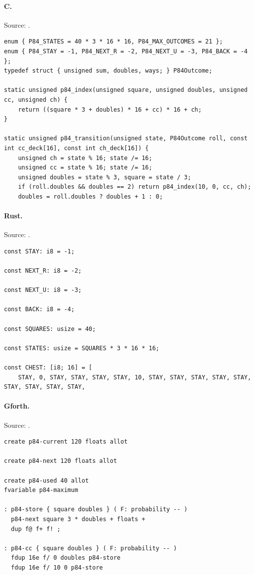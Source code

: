 \paragraph{C.} Source: .
\begin{lstlisting}
enum { P84_STATES = 40 * 3 * 16 * 16, P84_MAX_OUTCOMES = 21 };
enum { P84_STAY = -1, P84_NEXT_R = -2, P84_NEXT_U = -3, P84_BACK = -4 };
typedef struct { unsigned sum, doubles, ways; } P84Outcome;

static unsigned p84_index(unsigned square, unsigned doubles, unsigned cc, unsigned ch) {
    return ((square * 3 + doubles) * 16 + cc) * 16 + ch;
}

static unsigned p84_transition(unsigned state, P84Outcome roll, const int cc_deck[16], const int ch_deck[16]) {
    unsigned ch = state % 16; state /= 16;
    unsigned cc = state % 16; state /= 16;
    unsigned doubles = state % 3, square = state / 3;
    if (roll.doubles && doubles == 2) return p84_index(10, 0, cc, ch);
    doubles = roll.doubles ? doubles + 1 : 0;
\end{lstlisting}

\paragraph{Rust.} Source: .
\begin{lstlisting}
const STAY: i8 = -1;

const NEXT_R: i8 = -2;

const NEXT_U: i8 = -3;

const BACK: i8 = -4;

const SQUARES: usize = 40;

const STATES: usize = SQUARES * 3 * 16 * 16;

const CHEST: [i8; 16] = [
    STAY, 0, STAY, STAY, STAY, STAY, 10, STAY, STAY, STAY, STAY, STAY, STAY, STAY, STAY, STAY,
\end{lstlisting}

\paragraph{Gforth.} Source: .
\begin{lstlisting}
create p84-current 120 floats allot

create p84-next 120 floats allot

create p84-used 40 allot
fvariable p84-maximum

: p84-store { square doubles } ( F: probability -- )
  p84-next square 3 * doubles + floats +
  dup f@ f+ f! ;

: p84-cc { square doubles } ( F: probability -- )
  fdup 16e f/ 0 doubles p84-store
  fdup 16e f/ 10 0 p84-store
\end{lstlisting}

